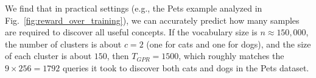 We find that in practical settings (e.g., the Pets example analyzed in Fig.~\ref{fig:reward_over_training}), we can accurately predict how many samples are required to discover all useful concepts. If the vocabulary size is $n \approx 150{,}000$, the number of clusters is about $c = 2$ (one for cats and one for dogs), and the size of each cluster is about $150$, then $T_{GPR} = 1500$, which roughly matches the $9 \times 256 = 1792$ queries it took to discover both cats and dogs in the Pets dataset.

